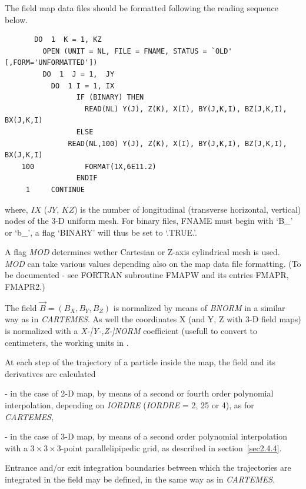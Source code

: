 \noindent The field map data files should be formatted following the \FORTRAN reading 
sequence below.

{\footnotesize
\begin{verbatim}
	   DO  1  K = 1, KZ
	     OPEN (UNIT = NL, FILE = FNAME, STATUS = `OLD' [,FORM='UNFORMATTED'])
	     DO  1  J = 1,  JY  
	       DO  1 I = 1, IX
                 IF (BINARY) THEN
                   READ(NL) Y(J), Z(K), X(I), BY(J,K,I), BZ(J,K,I), BX(J,K,I)
                 ELSE
	           READ(NL,100) Y(J), Z(K), X(I), BY(J,K,I), BZ(J,K,I), BX(J,K,I)
    100	           FORMAT(1X,6E11.2)
                 ENDIF
     1     CONTINUE
\end{verbatim}}
\medskip

\noindent where, $IX$ ($JY$, $KZ$)  is   the number of longitudinal 
(transverse horizontal, vertical) nodes of the 3-D uniform mesh. For binary files, 
FNAME must begin with  \mbox{`B\_'} or  \mbox{`b\_'}, a flag  `BINARY' will thus be set to `.TRUE.'.  

A flag \textsl{MOD} determines wether Cartesian or Z-axis cylindrical mesh is used. \textsl{MOD} can 
take various values depending also on the map data file formatting. (To be documented - see FORTRAN 
subroutine FMAPW and its entries FMAPR, FMAPR2.)

\bigskip

\noindent The field $ \vec  B=(B_X,B_Y,B_Z) $ is normalized by means of 
\textsl{BNORM} in a similar way as in \textsl{CARTEMES}.  
 As well the  coordinates  X (and Y, Z with 3-D field maps) is normalized with 
a  \textsl{X-[Y-,Z-]NORM} coefficient (usefull to convert to centimeters, the working units in  \zgoubi. 


\bigskip

\noindent At each step of the trajectory of a particle inside the map, the
field and its derivatives are calculated 

 - in the case of 2-D map,  by means of a second or fourth order polynomial interpolation, 
depending on \textsl{IORDRE} (\textsl{IORDRE} = 2, 25 or 4), as for 
\textsl{CARTEMES}, 

 - in the case of 3-D map, by means of a second order polynomial interpolation with a 
$3  \times   3   \times   3$-point parallelipipedic grid, as described in 
section~\ref{sec2.4.4}. 
\bigskip

\noindent Entrance and/or exit integration boundaries between which the trajectories
are integrated in the field may be defined, in the same way as in  \textsl{CARTEMES}. 





